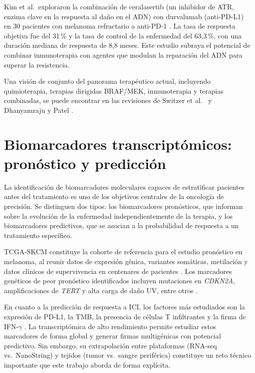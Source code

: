 Kim et al.\ exploraron la combinación de ceralasertib (un inhibidor de ATR, enzima clave en la respuesta al daño en el ADN) con durvalumab (anti-PD-L1) en 30 pacientes con melanoma refractario a anti-PD-1 \cite{Kim2022}. La tasa de respuesta objetiva fue del 31\,\% y la tasa de control de la enfermedad del 63,3\,\%, con una duración mediana de respuesta de 8,8 meses. Este estudio subraya el potencial de combinar inmunoterapia con agentes que modulan la reparación del ADN para superar la resistencia.

Una visión de conjunto del panorama terapéutico actual, incluyendo quimioterapia, terapias dirigidas BRAF/MEK, inmunoterapia y terapias combinadas, se puede encontrar en las revisiones de Switzer et al.\ \cite{Switzer2022} y Dhanyamraju y Patel \cite{Dhanyamraju2022}.

\section{Biomarcadores transcriptómicos: pronóstico y predicción}

La identificación de biomarcadores moleculares capaces de estratificar pacientes antes del tratamiento es uno de los objetivos centrales de la oncología de precisión. Se distinguen dos tipos: los biomarcadores pronósticos, que informan sobre la evolución de la enfermedad independientemente de la terapia, y los biomarcadores predictivos, que se asocian a la probabilidad de respuesta a un tratamiento específico.

TCGA-SKCM constituye la cohorte de referencia para el estudio pronóstico en melanoma, al reunir datos de expresión génica, variantes somáticas, metilación y datos clínicos de supervivencia en centenares de pacientes \cite{DasTCGA2020, TCGA}. Los marcadores genéticos de peor pronóstico identificados incluyen mutaciones en \textit{CDKN2A}, amplificaciones de \textit{TERT} y alta carga de daño UV, entre otros \cite{Podlipnik2021}.

En cuanto a la predicción de respuesta a ICI, los factores más estudiados son la expresión de PD-L1, la TMB, la presencia de células T infiltrantes y la firma de IFN-$\gamma$ \cite{Hamid2013, Robert2014}. La transcriptómica de alto rendimiento permite estudiar estos marcadores de forma global y generar firmas multigénicas con potencial predictivo. Sin embargo, su extrapolación entre plataformas (RNA-seq vs.\ NanoString) y tejidos (tumor vs.\ sangre periférica) constituye un reto técnico importante que este trabajo aborda de forma explícita.

